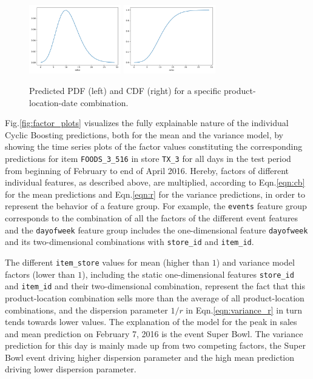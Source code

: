 \documentclass[BCOR=1mm, DIV=calc,10pt,
twoside=true,
twocolumn,
headings=normal]{scrartcl}
\newcommand{\fig}{Fig.}
\newcommand{\eqn}{Eqn.}
\begin{document}
\begin{figure}
\begin{center}
\includegraphics[width=4cm]{../figures/pdf}
\includegraphics[width=4cm]{../figures/cdf}
\caption{\label{fig:pdf_example} Predicted PDF (left) and CDF (right) for a specific product-location-date combination.}
\end{center}
\end{figure}

\fig \ref{fig:factor_plots} visualizes the fully explainable nature of the individual Cyclic Boosting predictions, both for the mean and the variance model, by showing the time series plots of the factor values constituting the corresponding predictions for item \texttt{FOODS\_3\_516} in store \texttt{TX\_3} for all days in the test period from beginning of February to end of April 2016. Hereby, factors of different individual features, as described above, are multiplied, according to \eqn \eqref{eqn:cb} for the mean predictions and \eqn \eqref{eqn:r} for the variance predictions, in order to represent the behavior of a feature group. For example, the \texttt{events} feature group corresponds to the combination of all the factors of the different event features and the \texttt{dayofweek} feature group includes the one-dimensional feature \texttt{dayofweek} and its two-dimensional combinations with \texttt{store\_id} and \texttt{item\_id}.

\noindent
The different \texttt{item\_store} values for mean (higher than $1$) and variance model factors (lower than $1$), including the static one-dimensional features \texttt{store\_id} and \texttt{item\_id} and their two-dimensional combination, represent the fact that this product-location combination sells more than the average of all product-location combinations, and the dispersion parameter $1/r$ in \eqn \eqref{eqn:variance_r} in turn tends towards lower values. The explanation of the model for the peak in sales and mean prediction on February 7, 2016 is the event Super Bowl. The variance prediction for this day is mainly made up from two competing factors, the Super Bowl event driving higher dispersion parameter and the high mean prediction driving lower dispersion parameter.
\end{document}
